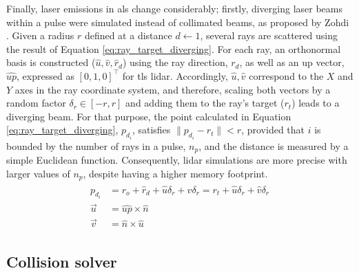 Finally, laser emissions in \acrshort{als} change considerably; firstly, diverging laser beams within a pulse were simulated instead of collimated beams, as proposed by Zohdi \cite{zohdi_rapid_2020}. Given a radius $r$ defined at a distance $d \gets 1$, several rays are scattered using the result of Equation \ref{eq:ray_target_diverging}. For each ray, an orthonormal basis is constructed ($\hat{u}, \hat{v}, \hat{r}_{d}$) using the ray direction, $r_{d}$, as well as an up vector, $\widehat{\textit{up}}$, expressed as $\left[0, 1, 0\right]^\intercal$ for \acrshort{tls} \acrshort{lidar}. Accordingly, $\hat{u}, \hat{v}$ correspond to the $X$ and $Y$ axes in the ray coordinate system, and therefore, scaling both vectors by a random factor $\delta_{r} \in [-r, r]$ and adding them to the ray's target ($r_{t}$) leads to a diverging beam. For that purpose, the point calculated in Equation \ref{eq:ray_target_diverging}, $p_{d_{i}}$, satisfies $\lVert p_{d_{i}} - r_{t}\rVert < r$, provided that $i$ is bounded by the number of rays in a pulse, $n_{p}$, and the distance is measured by a simple Euclidean function. Consequently, \acrshort{lidar} simulations are more precise with larger values of $n_{p}$, despite having a higher memory footprint.
\begin{gather}
    \label{eq:ray_target_diverging}
    \begin{aligned}
        p_{d_{i}} &= r_{o} + \hat{r}_{d} + \hat{u}\delta_{r} + \hat{v}\delta_{r} = r_{t} + \hat{u}\delta_{r} + \hat{v}\delta_{r}\\
        \vec{u} &= \widehat{\textit{up}} \times \hat{n}\\
        \vec{v} &= \hat{n} \times \hat{u}
    \end{aligned}
\end{gather}

\subsection{Collision solver}

